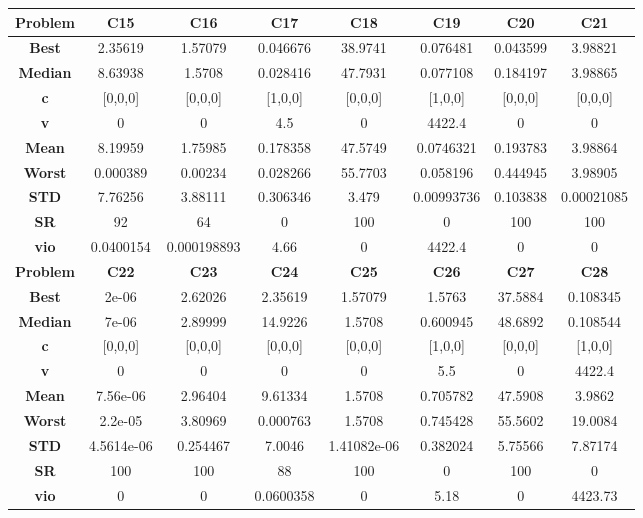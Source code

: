 \documentclass{IEEEtran}
\begin{document}
\begin{center}
\begin{tabular}{|c|c|c|c|c|c|c|c|}
    \hline 
    \hline 
    \textbf{Problem} & \textbf{C15} & \textbf{C16} & \textbf{C17} & \textbf{C18} & \textbf{C19} & \textbf{C20} & \textbf{C21} \\ 
    \hline\hline 
    \textbf{Best} & 2.35619 & 1.57079 & 0.046676 & 38.9741 & 0.076481 & 0.043599 & 3.98821\\ 
    \textbf{Median} & 8.63938 & 1.5708 & 0.028416 & 47.7931 & 0.077108 & 0.184197 & 3.98865\\ 
    \textbf{c} & [0,0,0] & [0,0,0] & [1,0,0] & [0,0,0] & [1,0,0] & [0,0,0] & [0,0,0]\\ 
    \textbf{v} & 0 & 0 & 4.5 & 0 & 4422.4 & 0 & 0\\ 
    \textbf{Mean} & 8.19959 & 1.75985 & 0.178358 & 47.5749 & 0.0746321 & 0.193783 & 3.98864\\ 
    \textbf{Worst} & 0.000389 & 0.00234 & 0.028266 & 55.7703 & 0.058196 & 0.444945 & 3.98905\\ 
    \textbf{STD} & 7.76256 & 3.88111 & 0.306346 & 3.479 & 0.00993736 & 0.103838 & 0.00021085\\ 
    \textbf{SR} & 92 & 64 & 0 & 100 & 0 & 100 & 100\\ 
    \textbf{vio} & 0.0400154 & 0.000198893 & 4.66 & 0 & 4422.4 & 0 & 0\\ 
    \hline 
    \hline 
    \textbf{Problem} & \textbf{C22} & \textbf{C23} & \textbf{C24} & \textbf{C25} & \textbf{C26} & \textbf{C27} & \textbf{C28} \\ 
    \hline\hline 
    \textbf{Best} & 2e-06 & 2.62026 & 2.35619 & 1.57079 & 1.5763 & 37.5884 & 0.108345\\ 
    \textbf{Median} & 7e-06 & 2.89999 & 14.9226 & 1.5708 & 0.600945 & 48.6892 & 0.108544\\ 
    \textbf{c} & [0,0,0] & [0,0,0] & [0,0,0] & [0,0,0] & [1,0,0] & [0,0,0] & [1,0,0]\\ 
    \textbf{v} & 0 & 0 & 0 & 0 & 5.5 & 0 & 4422.4\\ 
    \textbf{Mean} & 7.56e-06 & 2.96404 & 9.61334 & 1.5708 & 0.705782 & 47.5908 & 3.9862\\ 
    \textbf{Worst} & 2.2e-05 & 3.80969 & 0.000763 & 1.5708 & 0.745428 & 55.5602 & 19.0084\\ 
    \textbf{STD} & 4.5614e-06 & 0.254467 & 7.0046 & 1.41082e-06 & 0.382024 & 5.75566 & 7.87174\\ 
    \textbf{SR} & 100 & 100 & 88 & 100 & 0 & 100 & 0\\ 
    \textbf{vio} & 0 & 0 & 0.0600358 & 0 & 5.18 & 0 & 4423.73\\ 
    \hline 
  \end{tabular}
\end{center}
\newpage
\end{document}
